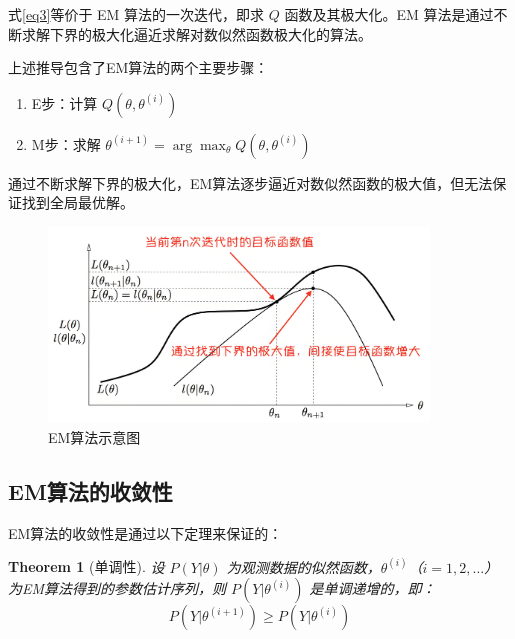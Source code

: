 \documentclass[a4paper,12pt]{ctexart} %
\newtheorem{theorem}{Theorem} %
\begin{document}
式\eqref{eq3}等价于 EM 算法的一次迭代，即求 \( Q \) 函数及其极大化。EM 算法是通过不断求解下界的极大化逼近求解对数似然函数极大化的算法。


上述推导包含了EM算法的两个主要步骤：

\begin{enumerate}
    \item E步：计算 \( Q(\theta, \theta^{(i)}) \)
    \item M步：求解 \( \theta^{(i+1)} = \arg \max_{\theta} Q(\theta, \theta^{(i)}) \)
\end{enumerate}

通过不断求解下界的极大化，EM算法逐步逼近对数似然函数的极大值，但无法保证找到全局最优解。
\begin{figure}[H]
    \centering
    \includegraphics[width=0.9\textwidth]{fig/EM算法示意图.jpg}
    \caption{EM算法示意图}
\end{figure}
\subsection{EM算法的收敛性}

EM算法的收敛性是通过以下定理来保证的：

\begin{theorem}[单调性]
设 \( P(Y|\theta) \) 为观测数据的似然函数，\( \theta^{(i)} \)（\( i = 1, 2, \dots \)）为EM算法得到的参数估计序列，则 \( P(Y|\theta^{(i)}) \) 是单调递增的，即：
\begin{equation}
P(Y|\theta^{(i+1)}) \geq P(Y|\theta^{(i)})
\end{equation}
\end{theorem}
\end{document}
